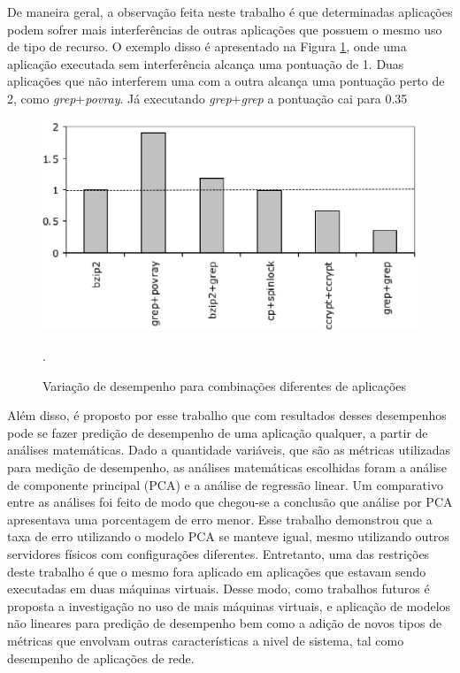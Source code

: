 De maneira geral, a observação feita neste trabalho é que determinadas aplicações podem sofrer mais interferências de outras aplicações que possuem o mesmo uso de tipo de recurso. O exemplo disso é apresentado na Figura \ref{interference_app}, onde uma aplicação executada sem interferência alcança uma pontuação de 1. Duas aplicações que não interferem uma com a outra alcança uma pontuação perto de 2, como \textit{grep}+\textit{povray}. Já executando \textit{grep}+\textit{grep} a pontuação cai para 0.35 %

\begin{figure}[!htb]
\centering
\includegraphics [keepaspectratio=true,scale=0.65]{figuras/interference_aplications.eps}
\caption{Variação de desempenho para combinações diferentes de aplicações}
\cite{koh2007}.
\label{interference_app}
\end{figure}

Além disso, é proposto por esse trabalho que com resultados desses desempenhos pode se fazer predição de desempenho de uma aplicação qualquer, a partir de análises matemáticas. Dado a quantidade variáveis, que são as métricas utilizadas para medição de desempenho, as análises matemáticas escolhidas foram a análise de componente principal (PCA) e a análise de regressão linear. Um comparativo entre as análises foi feito de modo que chegou-se a conclusão que análise por PCA apresentava uma porcentagem de erro menor. Esse trabalho demonstrou que a taxa de erro utilizando o modelo PCA se manteve igual, mesmo utilizando outros servidores físicos com configurações diferentes. Entretanto, uma das restrições deste trabalho é que o mesmo fora aplicado em aplicações que estavam sendo executadas em duas máquinas virtuais. Desse modo, como trabalhos futuros é proposta a investigação no uso de mais máquinas virtuais, e aplicação de modelos não lineares para predição de desempenho bem como a adição de novos tipos de métricas que envolvam outras características a nivel de sistema, tal como desempenho de aplicações de rede.

